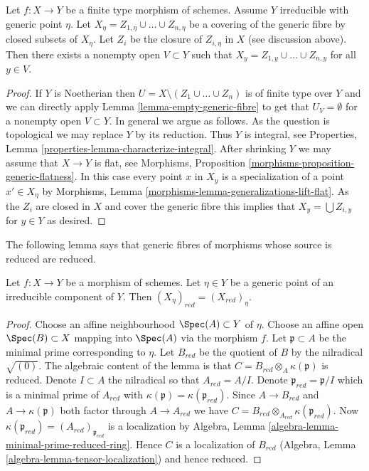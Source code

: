 \begin{lemma}
\label{lemma-cover-generic-fibre-neighbourhood}
Let $f : X \to Y$ be a finite type morphism of schemes. Assume
$Y$ irreducible with generic point $\eta$. Let
$X_\eta = Z_{1, \eta} \cup \ldots \cup Z_{n, \eta}$ be a covering of
the generic fibre by closed subsets of $X_\eta$.
Let $Z_i$ be the closure of $Z_{i, \eta}$ in $X$ (see discussion above).
Then there exists a nonempty open $V \subset Y$ such
that $X_y = Z_{1, y} \cup \ldots \cup Z_{n, y}$ for all $y \in V$.
\end{lemma}

\begin{proof}
If $Y$ is Noetherian then $U = X \setminus (Z_1 \cup \ldots \cup Z_n)$
is of finite type over $Y$ and we can directly apply
Lemma \ref{lemma-empty-generic-fibre}
to get that $U_V = \emptyset$ for a nonempty open $V \subset Y$.
In general we argue as follows. As the question is topological
we may replace $Y$ by its reduction. Thus $Y$ is integral, see
Properties, Lemma \ref{properties-lemma-characterize-integral}.
After shrinking $Y$ we may assume that $X \to Y$ is flat, see
Morphisms, Proposition \ref{morphisms-proposition-generic-flatness}.
In this case every point $x$ in $X_y$ is a specialization of a point
$x' \in X_\eta$ by
Morphisms, Lemma \ref{morphisms-lemma-generalizations-lift-flat}.
As the $Z_i$ are closed in $X$ and cover the generic fibre this
implies that $X_y = \bigcup Z_{i, y}$ for $y \in Y$ as desired.
\end{proof}

\noindent
The following lemma says that generic fibres of morphisms whose source is
reduced are reduced.

\begin{lemma}
\label{lemma-reduction-generic-fibre}
Let $f : X \to Y$ be a morphism of schemes. Let $\eta \in Y$ be a generic
point of an irreducible component of $Y$. Then
$(X_\eta)_{red} = (X_{red})_\eta$.
\end{lemma}

\begin{proof}
Choose an affine neighbourhood $\Spec(A) \subset Y$ of $\eta$.
Choose an affine open $\Spec(B) \subset X$ mapping into $\Spec(A)$
via the morphism $f$. Let $\mathfrak p \subset A$ be the minimal prime
corresponding to $\eta$. Let $B_{red}$ be the quotient of $B$ by
the nilradical $\sqrt{(0)}$. The algebraic content of the lemma is that
$C = B_{red} \otimes_A \kappa(\mathfrak p)$ is reduced.
Denote $I \subset A$ the nilradical so that $A_{red} = A/I$.
Denote $\mathfrak p_{red} = \mathfrak p/I$
which is a minimal prime of $A_{red}$ with
$\kappa(\mathfrak p) = \kappa(\mathfrak p_{red})$.
Since $A \to B_{red}$ and $A \to \kappa(\mathfrak p)$
both factor through $A \to A_{red}$ we have
$C = B_{red} \otimes_{A_{red}} \kappa(\mathfrak p_{red})$.
Now $\kappa(\mathfrak p_{red}) = (A_{red})_{\mathfrak p_{red}}$
is a localization by 
Algebra, Lemma \ref{algebra-lemma-minimal-prime-reduced-ring}.
Hence $C$ is a localization of $B_{red}$
(Algebra, Lemma \ref{algebra-lemma-tensor-localization})
and hence reduced.
\end{proof}

